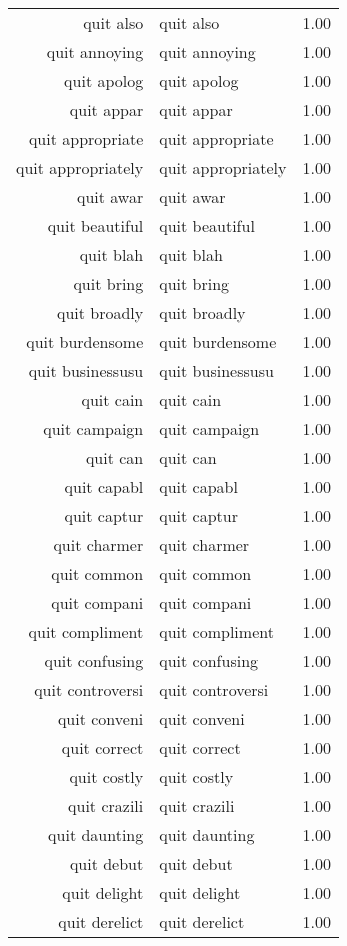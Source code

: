 \begin{table}[ht]
\begin{tabular}{rlr}
  quit also & quit also & 1.00 \\ 
  quit annoying & quit annoying & 1.00 \\ 
  quit apolog & quit apolog & 1.00 \\ 
  quit appar & quit appar & 1.00 \\ 
  quit appropriate & quit appropriate & 1.00 \\ 
  quit appropriately & quit appropriately & 1.00 \\ 
  quit awar & quit awar & 1.00 \\ 
  quit beautiful & quit beautiful & 1.00 \\ 
  quit blah & quit blah & 1.00 \\ 
  quit bring & quit bring & 1.00 \\ 
  quit broadly & quit broadly & 1.00 \\ 
  quit burdensome & quit burdensome & 1.00 \\ 
  quit businessusu & quit businessusu & 1.00 \\ 
  quit cain & quit cain & 1.00 \\ 
  quit campaign & quit campaign & 1.00 \\ 
  quit can & quit can & 1.00 \\ 
  quit capabl & quit capabl & 1.00 \\ 
  quit captur & quit captur & 1.00 \\ 
  quit charmer & quit charmer & 1.00 \\ 
  quit common & quit common & 1.00 \\ 
  quit compani & quit compani & 1.00 \\ 
  quit compliment & quit compliment & 1.00 \\ 
  quit confusing & quit confusing & 1.00 \\ 
  quit controversi & quit controversi & 1.00 \\ 
  quit conveni & quit conveni & 1.00 \\ 
  quit correct & quit correct & 1.00 \\ 
  quit costly & quit costly & 1.00 \\ 
  quit crazili & quit crazili & 1.00 \\ 
  quit daunting & quit daunting & 1.00 \\ 
  quit debut & quit debut & 1.00 \\ 
  quit delight & quit delight & 1.00 \\ 
  quit derelict & quit derelict & 1.00 \\ 

\end{tabular}
\end{table}
